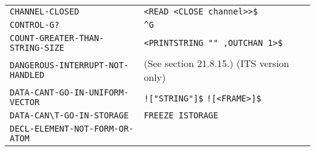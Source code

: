 \documentclass[a4paper]{scrbook}
\begin{document}
\begin{longtable}[]{@{}ll@{}}
\begin{minipage}[t]{0.58\columnwidth}
\texttt{CHANNEL-CLOSED}\strut
\end{minipage} & \begin{minipage}[t]{0.36\columnwidth}\raggedright\strut
\texttt{\textless{}READ\ \textless{}CLOSE\ channel\textgreater{}\textgreater{}\$}\strut
\end{minipage}\tabularnewline
\begin{minipage}[t]{0.58\columnwidth}\raggedright\strut
\texttt{CONTROL-G?}\strut
\end{minipage} & \begin{minipage}[t]{0.36\columnwidth}\raggedright\strut
\texttt{\^{}G}\strut
\end{minipage}\tabularnewline
\begin{minipage}[t]{0.58\columnwidth}\raggedright\strut
\texttt{COUNT-GREATER-THAN-STRING-SIZE}\strut
\end{minipage} & \begin{minipage}[t]{0.36\columnwidth}\raggedright\strut
\texttt{\textless{}PRINTSTRING\ ""\ ,OUTCHAN\ 1\textgreater{}\$}\strut
\end{minipage}\tabularnewline
\begin{minipage}[t]{0.58\columnwidth}\raggedright\strut
\texttt{DANGEROUS-INTERRUPT-NOT-HANDLED}\strut
\end{minipage} & \begin{minipage}[t]{0.36\columnwidth}\raggedright\strut
(See section 21.8.15.) (ITS version only)\strut
\end{minipage}\tabularnewline
\begin{minipage}[t]{0.58\columnwidth}\raggedright\strut
\texttt{DATA-CANT-GO-IN-UNIFORM-VECTOR}\strut
\end{minipage} & \begin{minipage}[t]{0.36\columnwidth}\raggedright\strut
\texttt{!{[}"STRING"{]}\$} \texttt{!{[}\textless{}FRAME\textgreater{}{]}\$}\strut
\end{minipage}\tabularnewline
\begin{minipage}[t]{0.58\columnwidth}\raggedright\strut
\texttt{DATA-CAN\textbackslash{}\textquotesingle{}T-GO-IN-STORAGE}\strut
\end{minipage} & \begin{minipage}[t]{0.36\columnwidth}\raggedright\strut
\texttt{FREEZE\ ISTORAGE}\strut
\end{minipage}\tabularnewline
\begin{minipage}[t]{0.58\columnwidth}\raggedright\strut
\texttt{DECL-ELEMENT-NOT-FORM-OR-ATOM}\strut
\end{minipage} & \begin{minipage}[t]{0.36\columnwidth}\raggedright\strut

\end{minipage}
\end{longtable}
\end{document}
